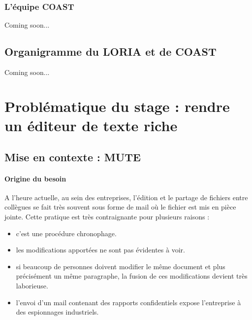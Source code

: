 \documentclass[12pt]{article}
\begin{document}
\subsubsection{L'équipe COAST}
Coming soon...

\subsection{Organigramme du LORIA et de COAST}
Coming soon...

\newpage
\section{Problématique du stage : rendre un éditeur de texte riche}
\subsection{Mise en contexte : MUTE}
\paragraph{Origine du besoin}
A l'heure actuelle, au sein des entreprises, l'édition et le partage de fichiers entre collègues se fait très souvent sous forme de mail où le fichier est mis en pièce jointe. Cette pratique est très contraignante pour plusieurs raisons :\\
\begin{itemize}
    \item c'est une procédure chronophage.
    \item les modifications apportées ne sont pas évidentes à voir.
    \item si beaucoup de personnes doivent modifier le même document et plus précisément un même paragraphe, la fusion de ces modifications devient très laborieuse.
    \item l'envoi d'un mail contenant des rapports confidentiels expose l'entreprise à des espionnages industriels.
\end{itemize}
\end{document}
